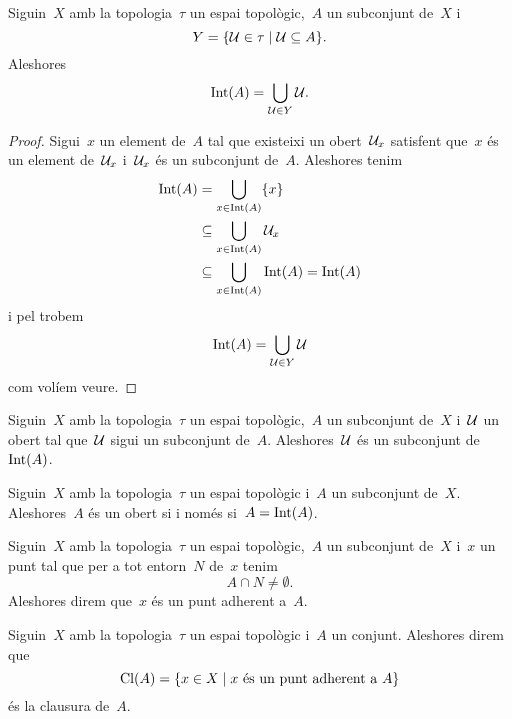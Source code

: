 \documentclass[../../Main.tex]{subfiles}
\begin{document}
	\begin{proposition}
		\label{prop:l'interior d'un conjunt és la unió de tots els oberts continguts en el conjunt}
		Siguin~\(X\) amb la topologia~\(\tau\) un espai topològic,~\(A\) un subconjunt de~\(X\) i
		\[
		    Y=\{\mathcal{U}\in\tau\mid\mathcal{U}\subseteq A\}.
		\]
		Aleshores
		\[
		    \operatorname{Int}(A)=\bigcup_{\mathcal{U}\in Y}\mathcal{U}.
		\]
		\begin{proof}
			Sigui~\(x\) un element de~\(A\) tal que existeixi un obert~\(\mathcal{U}_{x}\) satisfent que~\(x\) és un element de~\(\mathcal{U}_{x}\) i~\(\mathcal{U}_{x}\) és un subconjunt de~\(A\).
			Aleshores tenim
			\begin{align*}
				\operatorname{Int}(A)&=\bigcup_{x\in\operatorname{Int}(A)}\{x\} \\
				&\subseteq\bigcup_{x\in\operatorname{Int}(A)}\mathcal{U}_{x} \\
				&\subseteq\bigcup_{x\in\operatorname{Int}(A)}\operatorname{Int}(A)=\operatorname{Int}(A)
			\end{align*}
			i pel  trobem
			\[
			    \operatorname{Int}(A)=\bigcup_{\mathcal{U}\in Y}\mathcal{U}
			\]
			com volíem veure.
		\end{proof}
	\end{proposition}
	\begin{corollary}
		\label{cor:l'interior d'un conjunt conté tots els seus oberts}
		Siguin~\(X\) amb la topologia~\(\tau\) un espai topològic,~\(A\) un subconjunt de~\(X\) i~\(\mathcal{U}\) un obert tal que~\(\mathcal{U}\) sigui un subconjunt de~\(A\).
		Aleshores~\(\mathcal{U}\) és un subconjunt de~\(\operatorname{Int}(A)\).
	\end{corollary}
	\begin{corollary}
		\label{cor:un conjunt és obert si i només si és el seu interior}
		Siguin~\(X\) amb la topologia~\(\tau\) un espai topològic i~\(A\) un subconjunt de~\(X\).
		Aleshores~\(A\) és un obert si i només si~\(A=\operatorname{Int}(A)\).
	\end{corollary}
	\begin{definition}
		\label{def:punt adherent}
		Siguin~\(X\) amb la topologia~\(\tau\) un espai topològic,~\(A\) un subconjunt de~\(X\) i~\(x\) un punt tal que per a tot entorn~\(N\) de~\(x\) tenim
		\[
		    A\cap N\neq\emptyset.
		\]
		Aleshores direm que~\(x\) és un punt adherent a~\(A\).
	\end{definition}
	\begin{definition}[Clausura]
		\label{def:clausura}
		Siguin~\(X\) amb la topologia~\(\tau\) un espai topològic i~\(A\) un conjunt.
		Aleshores direm que
		\[
		    \operatorname{Cl}(A)=\{x\in X\mid x\text{ és un punt adherent a }A\}
		\]
		és la clausura de~\(A\).
	\end{definition}
\end{document}
